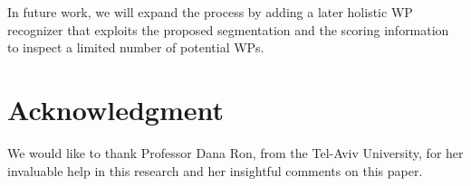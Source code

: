 \documentclass[10pt, conference, compsocconf]{IEEEtran}
\begin{document}
In future work, we will expand the process by adding a later holistic WP recognizer that exploits the proposed segmentation and the scoring information to inspect a limited number of potential WPs.

\section{Acknowledgment}
We would like to thank Professor Dana Ron, from the Tel-Aviv University, for her invaluable help in this research and her insightful comments on this paper. 



\end{document}

